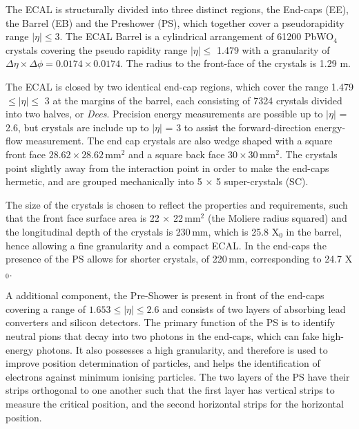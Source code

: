 The ECAL is structurally divided into three distinct regions, the End-caps (EE), the Barrel (EB) and the Preshower (PS), which together cover a pseudorapidity range $|\eta| \leq$3. The ECAL Barrel is a cylindrical arrangement of 61200 PbWO$_{4}$ crystals covering the pseudo rapidity range $|\eta| \leq$ 1.479 with a granularity of $\Delta \eta \times \Delta \phi = 0.0174 \times 0.0174$. The radius to the front-face of the crystals is 1.29 m. 


The ECAL is closed by two identical end-cap regions, which cover the range 1.479 $\leq |\eta| \leq$ 3 at the margins of the barrel, each consisting of 7324 crystals divided into two halves, or \textit{Dees}. Precision energy measurements are possible up to $|\eta|$ = 2.6, but crystals are include up to $|\eta|$ = 3 to assist the forward-direction energy-flow measurement. The end cap crystals are also wedge shaped with a square front face $28.62 \times 28.62$\,mm$^{2}$ and a square back face $30 \times 30$\,mm$^{2}$. The crystals point slightly away from the interaction point in order to make the end-caps hermetic, and are grouped mechanically into 5 $\times$ 5 super-crystals (SC). 

 The size of the crystals is chosen to reflect the properties and requirements, such that the front face surface area is 22 $\times$ 22\,mm$^{2}$ (the Moliere radius squared) and the longitudinal depth of the crystals is 230\,mm, which is 25.8 X$_{0}$ in the barrel, hence allowing a fine granularity and a compact ECAL. In the end-caps the presence of the PS allows for shorter crystals, of 220\,mm, corresponding to 24.7 X$_{0}$.

A additional component, the Pre-Shower is present in front of the end-caps covering a range of $1.653\leq |\eta|\leq2.6$ and consists of two layers of absorbing lead converters and silicon detectors. The primary function of the PS is to identify neutral pions that decay into two photons in the end-caps, which can fake high-energy photons. It also possesses a high granularity, and therefore is used to improve position determination of particles, and helps the identification of electrons against minimum ionising particles. The two layers of the PS have their strips orthogonal to one another such that the first layer has vertical strips to measure the critical position, and the second horizontal strips for the horizontal position. 


